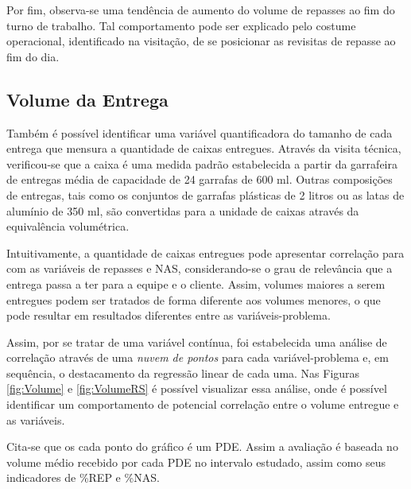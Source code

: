 Por fim, observa-se uma tendência de aumento do volume de repasses ao fim do turno de trabalho. Tal comportamento pode ser explicado pelo costume operacional, identificado na visitação, de se posicionar as revisitas de repasse ao fim do dia.

\subsection{Volume da Entrega}

Também é possível identificar uma variável quantificadora do tamanho de cada entrega que mensura a quantidade de caixas entregues.
Através da visita técnica, verificou-se que a caixa é uma medida padrão estabelecida a partir da garrafeira de entregas média de capacidade de 24 garrafas de 600 ml. 
Outras composições de entregas, tais como os conjuntos de garrafas plásticas de 2 litros ou as latas de alumínio de 350 ml, são convertidas para a unidade de caixas através da equivalência volumétrica.

Intuitivamente, a quantidade de caixas entregues pode apresentar correlação para com as variáveis de repasses e NAS, considerando-se o grau de relevância que a entrega passa a ter para a equipe e o cliente. Assim, volumes maiores a serem entregues podem ser tratados de forma diferente aos volumes menores, o que pode resultar em resultados diferentes entre as variáveis-problema.

Assim, por se tratar de uma variável contínua, foi estabelecida uma análise de correlação através de uma \textit{nuvem de pontos} para cada variável-problema e, em sequência, o destacamento da regressão linear de cada uma.
Nas Figuras \ref{fig:Volume} e \ref{fig:VolumeRS} é possível visualizar essa análise, onde é possível identificar um comportamento de potencial correlação entre o volume entregue e as variáveis.

Cita-se que os cada ponto do gráfico é um PDE. Assim a avaliação é baseada no volume médio recebido por cada PDE no intervalo estudado, assim como seus indicadores de \%REP e \%NAS.

